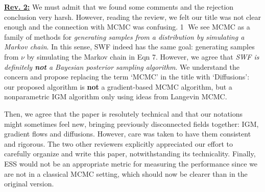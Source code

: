 \documentclass{article}
\newcommand{\umut}[1]{{\color{blue} #1}}
\newcommand{\antoine}[1]{{\color{orange} #1}}
\newcommand{\ubul}[1]{{\large \color{red} \textcircled{\small #1}}}
\begin{document}
%
\textbf{\color{red} \underline{Rev. 2:}}
%
We must admit that we found some comments and the rejection conclusion very harsh. However, reading the review, we felt our title was not clear enough and the connection with MCMC was confusing.
\ubul{1} We see MCMC as a family of methods for \emph{generating samples from a distribution by simulating a Markov chain}. In this sense, SWF indeed has the same goal: generating samples from $\nu$ by simulating the Markov chain in Eqn 7. However, we agree that \emph{SWF is definitely \textbf{not} a Bayesian posterior sampling algorithm}. We understand the concern and propose replacing the term `MCMC' in the title with `Diffusions': our proposed algorithm is \textbf{not} a gradient-based MCMC algorithm, but a nonparametric IGM algorithm only using ideas from Langevin MCMC.

\vspace{-5pt}Then, we agree that the paper is resolutely technical and that our notations might sometimes feel new, bringing previously disconnected fields together:  IGM, gradient flows and diffusions. However, care was taken to have them consistent and rigorous. The two other reviewers explicitly appreciated our effort to carefully organize and write this paper, notwithstanding its technicality.
Finally, ESS would not be an appropriate metric for measuring the performance since we are not in a classical MCMC setting, which should now be clearer than in the original version.
\end{document}
